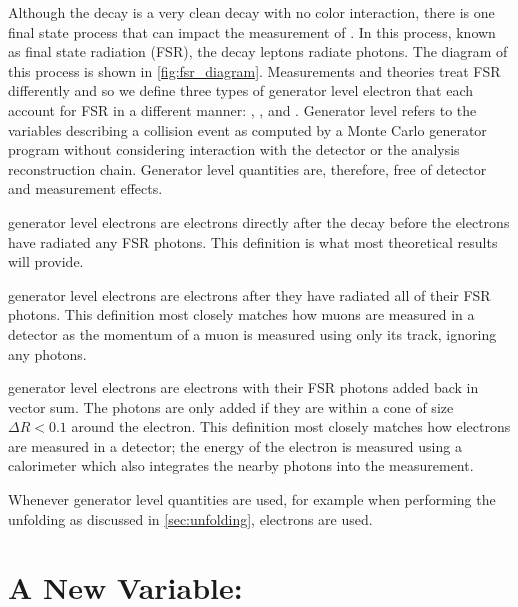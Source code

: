 Although the \Ztoee decay is a very clean decay with no color interaction,
there is one final state process that can impact the measurement of \Z
\bosonpt. In this process, known as final state radiation (FSR),  the decay
leptons radiate photons.  The diagram of this process is shown in
\cref{fig:fsr_diagram}. Measurements and theories treat FSR differently and so
we define three types of generator level electron that each account for FSR in
a different manner: \born, \bare, and \dressed. Generator level refers to the
variables describing a collision event as computed by a Monte Carlo generator
program without considering interaction with the detector or the analysis
reconstruction chain. Generator level quantities are, therefore, free of
detector and measurement effects.

\Born generator level electrons are electrons directly after the \Ztoee decay
before the electrons have radiated any FSR photons. This definition is what
most theoretical results will provide.

\Bare generator level electrons are \born electrons after they have radiated all
of their FSR photons. This definition most closely matches how muons are
measured in a detector as the momentum of a muon is measured using only its
track, ignoring any photons.

\Dressed generator level electrons are \bare electrons with their FSR photons
added back in vector sum. The photons are only added if they are within a cone
of size $\Delta R < 0.1$ around the electron. This definition most closely
matches how electrons are measured in a detector; the energy of the electron is
measured using a calorimeter which also integrates the nearby photons into the
measurement.

Whenever generator level quantities are used, for example when performing the
unfolding as discussed in \cref{sec:unfolding}, \dressed electrons are
used.


\section{A New Variable: \texorpdfstring{\phistar}{Phistar}}

